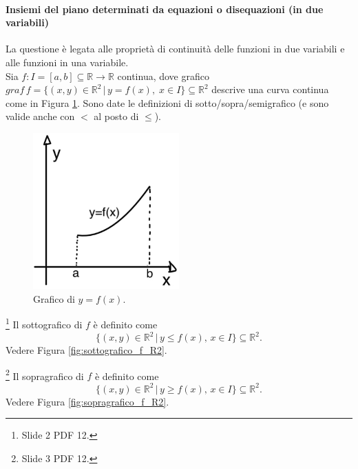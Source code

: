 \paragraph{Insiemi del piano determinati da equazioni o disequazioni (in due variabili)} La questione è legata alle proprietà di continuità delle funzioni in due variabili e alle funzioni in una variabile.\\
Sia $f\colon I=[a,b]\subseteq\mathbb R\rightarrow\mathbb R$ continua, dove grafico $graf\, f=\{(x,y)\in\mathbb R^2\,|\, y=f(x),\; x\in I\}\subseteq\mathbb R^2$ descrive una curva \footnotemark continua come in Figura \ref{fig:grafico_f_R2}. Sono date le definizioni di sotto/sopra/semigrafico (e sono valide anche con $<$ al posto di $\leq$).

\begin{figure}
    \centering
    \includegraphics[width=0.5\textwidth]{Analisi2/figures/grafico_f_R2}
        \caption{Grafico di $y=f(x)$.}\label{fig:grafico_f_R2}
\end{figure}

\begin{definition}[Sottografico]\footnote{Slide 2 PDF 12.}
    Il sottografico di $f$ è definito come
    \begin{equation*}
        \{(x,y)\in\mathbb R^2\,|\, y\leq f(x),\, x\in I\}\subseteq\mathbb R^2.
    \end{equation*}
    Vedere Figura \ref{fig:sottografico_f_R2}.
\end{definition}
\begin{definition}[Sopragrafico]\footnote{Slide 3 PDF 12.}
    Il sopragrafico di $f$ è definito come
    \begin{equation*}
        \{(x,y)\in\mathbb R^2\,|\, y\geq f(x),\, x\in I\}\subseteq\mathbb R^2.
    \end{equation*}
    Vedere Figura \ref{fig:sopragrafico_f_R2}.
\end{definition}

